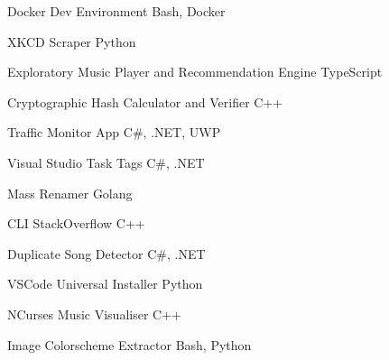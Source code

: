 
\begin{projentries}

\projentry%
  {Docker Dev Environment} %
  {Bash, Docker} %
  {} %
  {}

\projentry%
  {XKCD Scraper} %
  {Python} %
  {} %
  {}

\projentry%
  {Exploratory Music Player and Recommendation Engine} %
  {TypeScript} %
  {} %
  {}

\projentry%
  {Cryptographic Hash Calculator and Verifier} %
  {C++} %
  {} %
  {}

\projentry%
  {Traffic Monitor App} %
  {C\#, .NET, UWP} %
  {} %
  {}

\projentry%
  {Visual Studio Task Tags} %
  {C\#, .NET} %
  {} %
  {}

\projentry%
  {Mass Renamer} %
  {Golang} %
  {} %
  {}

\projentry%
  {CLI StackOverflow} %
  {C++} %
  {} %
  {}

\projentry%
  {Duplicate Song Detector} %
  {C\#, .NET} %
  {} %
  {}

\projentry%
  {VSCode Universal Installer} %
  {Python} %
  {} %
  {}

\projentry%
  {NCurses Music Visualiser} %
  {C++} %
  {} %
  {}

\projentry%
  {Image Colorscheme Extractor} %
  {Bash, Python} %
  {} %
  {}

\end{projentries}
